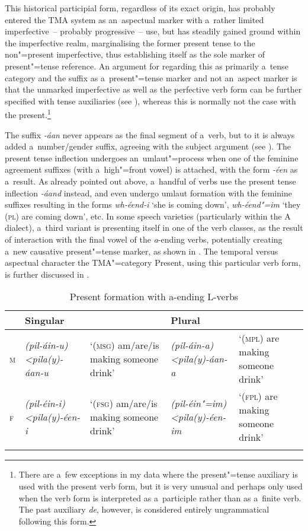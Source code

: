 This historical participial form, regardless of its exact origin, has probably entered the TMA system as an~aspectual marker with a~rather limited imperfective~-- probably progressive~-- use, but has steadily gained ground within the imperfective realm, marginalising the former present tense to the non"=present imperfective, thus establishing itself as the sole marker of present"=tense reference. An argument for regarding this as primarily a~tense category and the suffix as a~present"=tense marker and not an~aspect marker is that the unmarked imperfective as well as the perfective verb form can be further specified with tense auxiliaries (see ), whereas this is normally not the case with the present.\footnote{There are a~few exceptions in my data where the present"=tense auxiliary is used with the present verb form, but it is very unusual and perhaps only used when the verb form is interpreted as a~participle rather than as a~finite verb. The past auxiliary \textit{de}, however, is considered entirely ungrammatical following this form.} 


The suffix \textit{-áan} never appears as the final segment of a~verb, but to it is always added a~number/gender suffix, agreeing with the subject argument (see ). The present tense inflection undergoes an~umlaut"=process when one of the feminine agreement suffixes (with a~high"=front vowel) is attached, with the form \textit{-éen} as a~result. As already pointed out above, a~handful of verbs use the present tense inflection \textit{-áand} instead, and even undergo umlaut formation with the feminine suffixes resulting in the forms \textit{wh-éend-i} `she is coming down', \textit{wh-éend"=im} `they (\textsc{pl}) are coming down', etc. In some speech varieties (particularly within the A dialect), a~third variant is presenting itself in one of the verb classes, as the result of interaction with the final vowel of the \textit{a}-ending verbs, potentially creating a~new causative present"=tense marker, as shown in . The temporal versus aspectual character the TMA"=category Present, using this particular verb form, is further discussed in .


\begin{table}[t]
\caption{Present formation with a-ending L-verbs}
\begin{tabularx}{\textwidth}{ l P{25mm} Q P{25mm} Q }
\lsptoprule
&
Singular &
&
Plural &
\\\midrule
\textsc{m}
&
\textit{(pil-áin-u)}
\textit{{\textless}pila(y)-áan-u} &
`(\textsc{msg}) am/are/is making someone drink' &
\textit{(pil-áin-a)}
\textit{{\textless}pila(y)-áan-a} &
`(\textsc{mpl}) are making someone drink'\\
\textsc{f}
&
\textit{(pil-éin-i)}
\textit{{\textless}pila(y)-éen-i} &
`(\textsc{fsg}) am/are/is making someone drink' &
\textit{(pil-éin"=im)}
\textit{{\textless}pila(y)-éen-im} &
`(\textsc{fpl}) are making someone drink'\\\lspbottomrule
\end{tabularx}
\label{tab:8-25}
\end{table}



